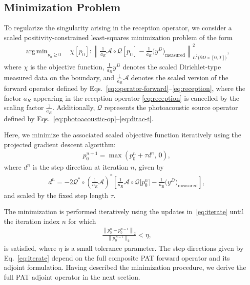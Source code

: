 \documentclass[11pt,reqno]{amsart}
\theoremstyle{remark}
\DeclareMathOperator*{\argmin}{arg\,min}
\begin{document}
\subsection{Minimization Problem} \label{sec:pat-minimization}
To regularize the singularity arising in the reception operator, we consider a scaled positivity-constrained least-squares minimization problem of the form
\begin{align} \label{eq:objective-function}
\argmin_{p_0 \geq 0}  \quad  \chi [p_0]:\left\| \frac{1}{a_R} \mathcal{A} \circ \mathcal{Q} [p_0] - \frac{1}{a_R} \bigl(y^D\bigr)_{\mathrm{measured}} \right\|_{ L^2 \big( \partial \Omega \times [0,T]\big) }^2,
\end{align}
where  $\chi$ is the objective function, $ \frac{1}{a_R} y^D$ denotes the scaled Dirichlet-type measured data on the boundary, and \(\frac{1}{a_R} \mathcal{A}\) denotes the scaled version of the forward operator defined by Eqs.~\eqref{eq:operator-forward}–\eqref{eq:reception}, where the factor \(a_R\) appearing in the reception operator \eqref{eq:reception} is cancelled by the scaling factor \(\frac{1}{a_R}\). Additionally, \(\mathcal{Q}\) represents the photoacoustic source operator defined by Eqs.~\eqref{eq:photoacoustic-op}–\eqref{eq:dirac-t}.



Here, we minimize the associated scaled objective function iteratively using the projected gradient descent algorithm:
\begin{align} \label{eq:iterate}
p_0^{n+1} = \max\left(p_0^n + \tau d^n,\, 0\right),
\end{align}
where \(d^n\) is the step direction at iteration \(n\), given by
\begin{align} \label{eq:step-direction}
d^n = - 2 \mathcal{Q}^* \circ \left(\frac{1}{a_R}\mathcal{A}\right)^* 
\left[
\frac{1}{a_R}\mathcal{A} \circ \mathcal{Q}  \mathcal[p_0^n]
-
\frac{1}{a_R}\bigl(y^D\bigr)_{\mathrm{measured}}
\right],
\end{align}
and scaled by the fixed step length \(\tau\).

The minimization is performed iteratively using the updates in~\eqref{eq:iterate} until the iteration index \(n\) for which
\begin{align} \label{eq:termination}
    \frac{\left\|p_0^{n} - p_0^{n-1}\right\|_2}{\|p_0^{\,n-1}\|_2} < \eta,
\end{align}
is satisfied, where \(  \eta \) is a small tolerance parameter. The step directions given by Eq.~\eqref{eq:iterate} depend on the full composite PAT forward operator and its adjoint formulation. Having described the minimization procedure, we derive the full PAT adjoint operator in the next section.
\end{document}
